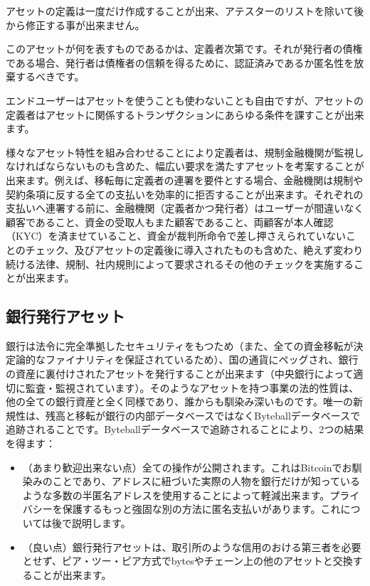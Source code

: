 \documentclass[a4paper, dvipdfmx]{jsarticle}
\begin{document}
アセットの定義は一度だけ作成することが出来、アテスターのリストを除いて後から修正する事が出来ません。

このアセットが何を表すものであるかは、定義者次第です。それが発行者の債権である場合、発行者は債権者の信頼を得るために、認証済みであるか匿名性を放棄するべきです。

エンドユーザーはアセットを使うことも使わないことも自由ですが、アセットの定義者はアセットに関係するトランザクションにあらゆる条件を課すことが出来ます。

様々なアセット特性を組み合わせることにより定義者は、規制金融機関が監視しなければならないものも含めた、幅広い要求を満たすアセットを考案することが出来ます。例えば、移転毎に定義者の連署を要件とする場合、金融機関は規制や契約条項に反する全ての支払いを効率的に拒否することが出来ます。それぞれの支払いへ連署する前に、金融機関（定義者かつ発行者）はユーザーが間違いなく顧客であること、資金の受取人もまた顧客であること、両顧客が本人確認（KYC）を済ませていること、資金が裁判所命令で差し押さえられていないことのチェック、及びアセットの定義後に導入されたものも含めた、絶えず変わり続ける法律、規制、社内規則によって要求されるその他のチェックを実施することが出来ます。

\subsection{銀行発行アセット}
銀行は法令に完全準拠したセキュリティをもつため（また、全ての資金移転が決定論的なファイナリティを保証されているため）、国の通貨にペッグされ、銀行の資産に裏付けされたアセットを発行することが出来ます（中央銀行によって適切に監査・監視されています）。そのようなアセットを持つ事業の法的性質は、他の全ての銀行資産と全く同様であり、誰からも馴染み深いものです。唯一の新規性は、残高と移転が銀行の内部データベースではなくByteballデータベースで追跡されることです。Byteballデータベースで追跡されることにより、2つの結果を得ます：

\begin{itemize}
    \item （あまり歓迎出来ない点）全ての操作が公開されます。これはBitcoinでお馴染みのことであり、アドレスに紐づいた実際の人物を銀行だけが知っているような多数の半匿名アドレスを使用することによって軽減出来ます。プライバシーを保護するもっと強固な別の方法に匿名支払いがあります。これについては後で説明します。
    \item （良い点）銀行発行アセットは、取引所のような信用のおける第三者を必要とせず、ピア・ツー・ピア方式でbytesやチェーン上の他のアセットと交換することが出来ます。
\end{itemize}
\end{document}
